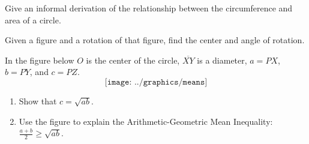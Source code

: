 
%
%
%
\begin{prob}
Give an informal derivation of the relationship between the circumference and area of a circle. 
\end{prob}

\begin{prob}
Given a figure and a rotation of that figure, find the center and angle of rotation.  
\end{prob}

\begin{prob}
In the figure below  $O$ is the center of the circle, $\overline{XY}$ is a diameter, $a = PX$, $b=PY$, and $c=PZ$.  
$$\texttt{[image: ../graphics/means]}$$
\begin{enumerate}
\item Show that $c=\sqrt{ab}$.  
\item Use the figure to explain the Arithmetic-Geometric Mean Inequality: $\frac{a+b}{2} \ge \sqrt{ab}$.  
\end{enumerate}
\end{prob}

